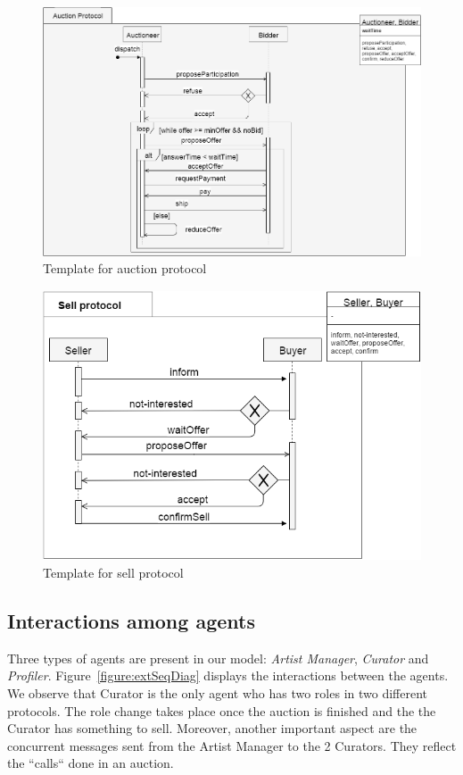 \documentclass[a4paper,11pt]{report}
\begin{document}
   \begin{figure}[ht!]
    \centering
    \includegraphics[width=\textwidth]{media/auction_protocol.png}
    \caption{Template for auction protocol}
    \label{figure:auctionProtocol}
   \end{figure}
   
   \begin{figure}[ht!]
    \centering
    \includegraphics[height=8cm]{media/sell_protocol.png}
    \caption{Template for sell protocol}
    \label{figure:sellProtocol}
   \end{figure}
  
  \subsection{Interactions among agents}
  Three types of agents are present in our model: \textit{Artist Manager}, \textit{Curator}
  and \textit{Profiler}. Figure~\ref{figure:extSeqDiag} displays the interactions between
  the agents. We observe that Curator is the only agent who has two roles in two
  different protocols. The role change takes place once the auction is finished and
  the the Curator has something to sell. Moreover, another important aspect are the concurrent
  messages sent from the Artist Manager to the 2 Curators. They reflect the ``calls`` done
  in an auction.
  
\end{document}
